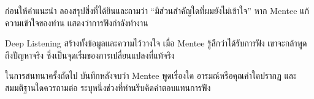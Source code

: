 \begin{mentornote}
ก่อนให้คำแนะนำ ลองสรุปสิ่งที่ได้ยินและถามว่า \enquote{มีส่วนสำคัญใดที่ผมยังไม่เข้าใจ} หาก Mentee แก้ความเข้าใจของท่าน แสดงว่าการฟังกำลังทำงาน
\end{mentornote}

\begin{keytakeaway}
Deep Listening สร้างทั้งข้อมูลและความไว้วางใจ เมื่อ Mentee รู้สึกว่าได้รับการฟัง เขาจะกล้าพูดถึงปัญหาจริง ซึ่งเป็นจุดเริ่มของการเปลี่ยนแปลงที่แท้จริง
\end{keytakeaway}

\begin{reflection}
ในการสนทนาครั้งถัดไป บันทึกหลังจบว่า Mentee พูดเรื่องใด อารมณ์หรือคุณค่าใดปรากฏ และสมมติฐานใดควรถามต่อ ระบุหนึ่งช่วงที่ท่านรีบคิดคำตอบแทนการฟัง
\blankline\blankline
\end{reflection}

